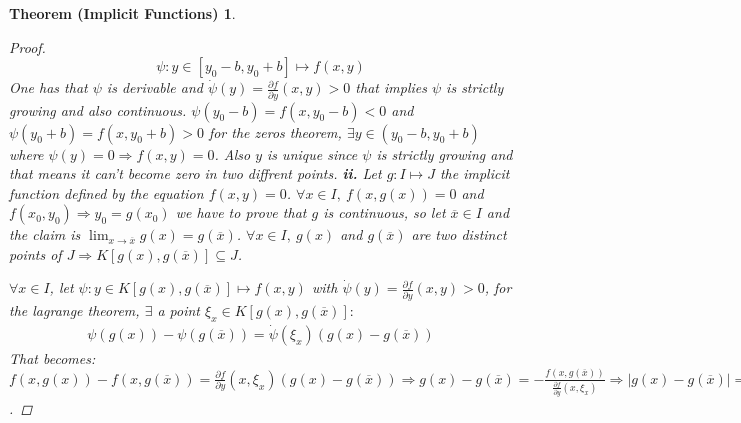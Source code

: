\documentclass{article}
\newtheorem*{implicitfunctions}{Theorem (Implicit Functions)}
\begin{document}
\begin{implicitfunctions}
\begin{proof}
                    \begin{equation*}
                        \psi: y\in [y_0 - b, y_0 + b] \longmapsto f(x,y)
                    \end{equation*}
                    One has that $\psi$ is derivable and $\dot{\psi}(y) = \frac{\partial f}{\partial y}(x,y) >0$ that implies $\psi$ is strictly growing and also continuous. $\psi (y_0 - b) = f(x,y_0 - b) < 0$ and $\psi(y_0 + b) = f(x,y_0 + b) > 0$ for the zeros theorem, $\exists y \in (y_0 - b, y_0 + b)$ where $\psi(y) = 0 \Rightarrow f(x,y) = 0$. Also $y$ is unique since $\psi$ is strictly growing and that means it can't become zero in two diffrent points.
                    \textbf{ii.} Let $g: I \longmapsto J$ the implicit function defined by the equation $f(x,y) = 0$. $\forall x \in I, \ f(x,g(x)) = 0$ and $f(x_0,y_0) \Rightarrow y_0 = g(x_0)$ we have to prove that $g$ is continuous, so let $\overline{x} \in I$ and the claim is $\lim_{x \to \overline{x}}g(x) = g(\overline{x})$. $\forall x \in I, \ g(x)$ and $g(\overline{x})$ are two distinct points of $J \Rightarrow K[g(x),g(\overline{x})] \subseteq J$. \\
                    \begin{center} 
                    \end{center}   
                    $\forall x \in I$, let $\psi : y\in K[g(x),g(\overline{x})] \longmapsto f(x,y)$ 
                    with $\dot{\psi}(y) = \frac{\partial f}{\partial y}(x,y) > 0$, for the lagrange theorem, $\exists$ a point $\xi_x \in K[g(x),g(\overline{x})]:$ 
                    \begin{gather*}
                        \psi(g(x)) - \psi(g(\overline{x})) = \dot{\psi}(\xi_x)(g(x) - g(\overline{x})) 
                    \end{gather*}
                    That becomes: $f(x,g(x)) - f(x,g(\overline{x})) = \frac{\partial f}{\partial y}(x,\xi_x)(g(x) - g(\overline{x})) \Rightarrow g(x) - g(\overline{x}) = -\frac{f(x,g(\overline{x}))}{\frac{\partial f}{\partial y}(x,\xi_x)} \Rightarrow \left\lvert g(x) - g(\overline{x}) \right\rvert = \frac{\left\lvert f(x,g(\overline{x})) \right\rvert }{\left\lvert \frac{\partial f}{\partial y}(x,\xi_x)\right\rvert}$.

\end{proof}
\end{implicitfunctions}
\end{document}
